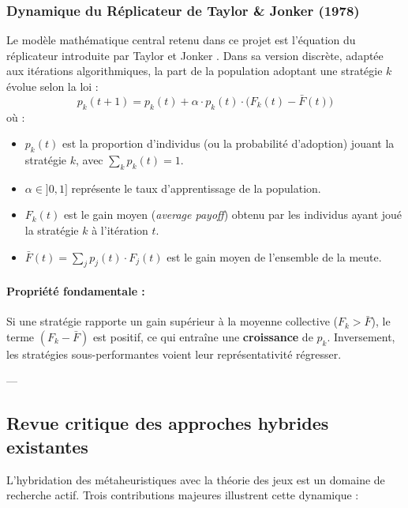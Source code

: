 \subsubsection{Dynamique du Réplicateur de Taylor \& Jonker (1978)}
Le modèle mathématique central retenu dans ce projet est l'équation du réplicateur introduite par Taylor et Jonker \cite{taylor1978evolutionary}. Dans sa version discrète, adaptée aux itérations algorithmiques, la part de la population adoptant une stratégie $k$ évolue selon la loi :
\begin{equation}
    p_k(t+1) = p_k(t) + \alpha \cdot p_k(t) \cdot \Big(F_k(t) - \bar{F}(t)\Big)
    \label{eq:replicator}
\end{equation}
où :
\begin{itemize}
    \item $p_k(t)$ est la proportion d'individus (ou la probabilité d'adoption) jouant la stratégie $k$, avec $\sum_k p_k(t) = 1$.
    \item $\alpha \in ]0, 1]$ représente le taux d'apprentissage de la population.
    \item $F_k(t)$ est le gain moyen (\textit{average payoff}) obtenu par les individus ayant joué la stratégie $k$ à l'itération $t$.
    \item $\bar{F}(t) = \sum_{j} p_j(t) \cdot F_j(t)$ est le gain moyen de l'ensemble de la meute.
\end{itemize}

\paragraph{Propriété fondamentale :}
Si une stratégie rapporte un gain supérieur à la moyenne collective ($F_k > \bar{F}$), le terme $(F_k - \bar{F})$ est positif, ce qui entraîne une \textbf{croissance} de $p_k$. Inversement, les stratégies sous-performantes voient leur représentativité régresser.

---

\subsection{Revue critique des approches hybrides existantes}

L'hybridation des métaheuristiques avec la théorie des jeux est un domaine de recherche actif. Trois contributions majeures illustrent cette dynamique :

